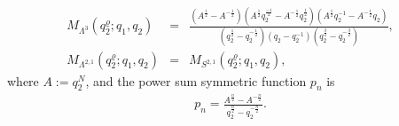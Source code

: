 \documentclass[hyper,letterpaper]{JHEP3}
\begin{document}
\begin{eqnarray}
M_{\Lambda^3}(q_2^{\varrho};q_1,q_2)&=&\frac{\left(A^{\frac{1}{2}}-A^{-\frac{1}{2}}\right)\left(
A^{\frac{1}{2}}q_2^{\frac{-1}{2}}-A^{-\frac{1}{2}}q_2^{\frac{1}{2}}\right)
\left(
A^{\frac{1}{2}}q_2^{-1}-A^{-\frac{1}{2}}q_2\right)}
{\left(q_2^{\frac{1}{2}}-q_2^{-\frac{1}{2}}\right)
\left(q_2-q_2^{-1}\right)
\left(q_2^{\frac{3}{2}}-q_2^{-\frac{3}{2}}\right)
},\nonumber \\
M_{\Lambda^{2,1}}(q_2^{\varrho};q_1,q_2)&=&M_{S^{2,1}}(q_2^{\varrho};q_1,q_2),
\end{eqnarray}
where $A:=q_2^N$, and the power sum symmetric function $p_n$ is
\begin{eqnarray}
 p_n=\frac{A^{\frac{n}{2}}-A^{-\frac{n}{2}}}{q_2^{\frac{n}{2}}-q_2^{-\frac{n}{2}}}.
\end{eqnarray}
\end{document}

